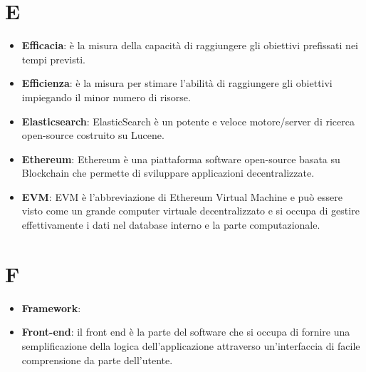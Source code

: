 \documentclass[a4paper, oneside, openany]{article}
\begin{document}
\section{E}
\begin{itemize}
\item \textbf{Efficacia}: è la misura della capacità di raggiungere gli obiettivi prefissati nei tempi previsti.
\item \textbf{Efficienza}: è la misura per stimare l'abilità di raggiungere gli obiettivi impiegando il minor numero di risorse.
\item \textbf{Elasticsearch}: ElasticSearch è un potente e veloce motore/server di ricerca open-source costruito su Lucene.
\item \textbf{Ethereum}: Ethereum è una piattaforma software open-source basata su Blockchain che permette di sviluppare applicazioni decentralizzate.
\item \textbf{EVM}: EVM è l'abbreviazione di Ethereum Virtual Machine e può essere visto come un grande computer virtuale decentralizzato e si occupa di gestire effettivamente i dati nel database interno e la parte computazionale.
\end{itemize}

\section{F}
\begin{itemize}
\item \textbf{Framework}:
\item \textbf{Front-end}: il front end è la parte del software che si occupa di fornire una semplificazione della logica dell'applicazione attraverso un'interfaccia di facile comprensione da parte dell'utente.
\end{itemize}
\end{document}
